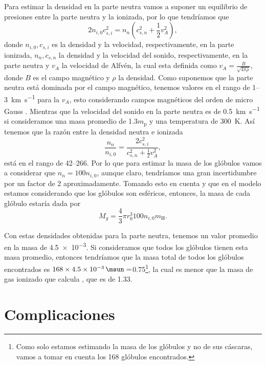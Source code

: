 \documentclass{book}
\begin{document}
Para estimar la densidad en la parte neutra vamos a suponer un equilibrio de presiones entre la parte neutra y la ionizada, por lo que tendríamos que
\begin{equation}
    2 n_{i,0}c_{s,i}^2 = n_n(c_{s,n}^2+\frac{1}{2}v_A^2),
\end{equation}
donde $n_{i,0}, c_{s,i}$ es la densidad y la velocidad, respectivamente, en la parte ionizada, $n_n, c_{s,n}$ la densidad y la velocidad del sonido, respectivamente, en la parte neutra y $v_A$ la velocidad de Alfvén, la cual esta definida como $v_A=\frac{B}{\sqrt{4\pi \rho}}$,  donde $B$ es el campo magnético y $\rho$ la densidad. Como suponemos que la parte neutra está dominada por el campo magnético, tenemos valores en el rango de 1--\SI{3}{km.s^{-1}} para la $v_A$, esto considerando campos magnéticos del orden de micro Gauss \citep{Bertoldi_1989}. Mientras que la velocidad del sonido en la parte neutra es de \SI{0.5}{km.s^{-1}} si consideramos una masa promedio de 1.3$m_\mathrm{p}$ y una temperatura de \SI{300}{K}. Así tenemos que la razón entre la densidad neutra e ionizada 
\begin{equation}
    \frac{n_n}{n_{i,0}}=\frac{2c_{s,i}^2}{c_{s,n}^2+\frac{1}{2}v_A^2},
\end{equation}
está en el rango de 42--266. Por lo que para estimar la masa de los glóbulos vamos a considerar que $n_n=100n_{i,0}$, aunque claro, tendríamos una gran incertidumbre por un factor de 2 aproximadamente. Tomando esto en cuenta y que en el modelo estamos considerando que los glóbulos son esféricos, entonces, la masa de cada glóbulo estaría dada por
\begin{equation}
    M_g = \frac{4}{3}\pi r_0^3 100n_{i,0} m_\mathrm{H}.
\end{equation}

Con estas densidades obtenidas para la parte neutra, tenemos un valor promedio en la masa de \SI{4.5e-3}{\msun}.
Si consideramos que todos los glóbulos tienen esta masa promedio, entonces tendríamos que la masa total de todos los glóbulos encontrados es $168\times\SI{4.5e-3}{\msun}=$\SI{0.75}{\msun}\footnote{Como solo estamos estimando la masa de los glóbulos y no de sus cáscaras, vamos a tomar en cuenta los 168 glóbulos encontrados. }, la cual es menor que la masa de gas ionizado que calcula \cite{Grosdidier:1998}, que es de \SI{1.33}{\msun}.

\section{Complicaciones }
\end{document}
